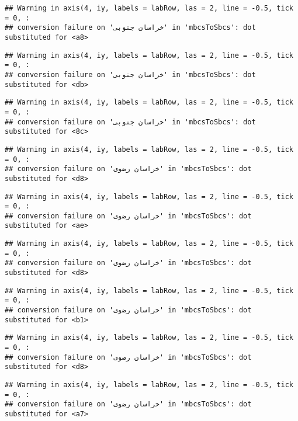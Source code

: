 \documentclass[
]{article}
\begin{document}
\begin{verbatim}
## Warning in axis(4, iy, labels = labRow, las = 2, line = -0.5, tick = 0, :
## conversion failure on 'خراسان جنوبی' in 'mbcsToSbcs': dot substituted for <a8>
\end{verbatim}

\begin{verbatim}
## Warning in axis(4, iy, labels = labRow, las = 2, line = -0.5, tick = 0, :
## conversion failure on 'خراسان جنوبی' in 'mbcsToSbcs': dot substituted for <db>
\end{verbatim}

\begin{verbatim}
## Warning in axis(4, iy, labels = labRow, las = 2, line = -0.5, tick = 0, :
## conversion failure on 'خراسان جنوبی' in 'mbcsToSbcs': dot substituted for <8c>
\end{verbatim}

\begin{verbatim}
## Warning in axis(4, iy, labels = labRow, las = 2, line = -0.5, tick = 0, :
## conversion failure on 'خراسان رضوی' in 'mbcsToSbcs': dot substituted for <d8>
\end{verbatim}

\begin{verbatim}
## Warning in axis(4, iy, labels = labRow, las = 2, line = -0.5, tick = 0, :
## conversion failure on 'خراسان رضوی' in 'mbcsToSbcs': dot substituted for <ae>
\end{verbatim}

\begin{verbatim}
## Warning in axis(4, iy, labels = labRow, las = 2, line = -0.5, tick = 0, :
## conversion failure on 'خراسان رضوی' in 'mbcsToSbcs': dot substituted for <d8>
\end{verbatim}

\begin{verbatim}
## Warning in axis(4, iy, labels = labRow, las = 2, line = -0.5, tick = 0, :
## conversion failure on 'خراسان رضوی' in 'mbcsToSbcs': dot substituted for <b1>
\end{verbatim}

\begin{verbatim}
## Warning in axis(4, iy, labels = labRow, las = 2, line = -0.5, tick = 0, :
## conversion failure on 'خراسان رضوی' in 'mbcsToSbcs': dot substituted for <d8>
\end{verbatim}

\begin{verbatim}
## Warning in axis(4, iy, labels = labRow, las = 2, line = -0.5, tick = 0, :
## conversion failure on 'خراسان رضوی' in 'mbcsToSbcs': dot substituted for <a7>
\end{verbatim}
\end{document}
